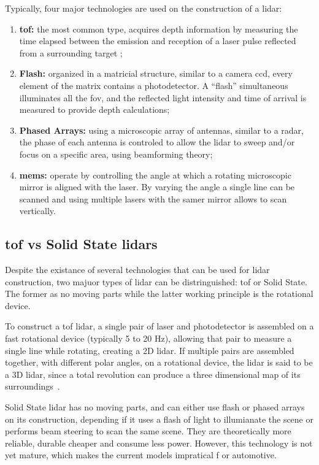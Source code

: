 Typically, four major technologies are used on the construction of a \ac{lidar}:

\begin{enumerate}
	\item \textbf{\ac{tof}:} the most common type, acquires depth information by measuring the time elapsed between the emission and reception of a \ac{laser} pulse reflected from a surrounding target \cite{Sullivan2016};
	\item \textbf{Flash:} organized in a matricial structure, similar to a camera \ac{ccd}, every element of the matrix contains a photodetector. A ``flash'' simultaneous illuminates all the \ac{fov}, and the reflected light intensity and time of arrival is measured to provide depth calculations; 
	\item \textbf{Phased Arrays:} using a microscopic array of antennas, similar to a \ac{radar}, the phase of each antenna is controled to allow the \ac{lidar} to sweep and/or focus on a specific area, using beamforming theory;
	\item \textbf{\ac{mems}:} operate by controlling the angle at which a rotating microscopic mirror is aligned with the \ac{laser}. By varying the angle a single line can be scanned and using multiple \acp{laser} with the samer mirror allows to scan vertically.

\end{enumerate}


\subsection{\acl{tof} vs Solid State \acp{lidar}}
Despite the existance of several technologies that can be used for \ac{lidar} construction, two majuor types of \ac{lidar} can be distringuished: \ac{tof} or Solid State. The former as no moving parts while the latter working principle is the rotational device.

To construct a \ac{tof} \ac{lidar}, a single pair of \ac{laser} and photodetector is assembled on a fast rotational device (typically 5 to 20 Hz), allowing that pair to measure a single line while rotating, creating a 2D \ac{lidar}. If multiple pairs are assembled together, with different polar angles, on a rotational device, the \ac{lidar} is said to be a 3D \ac{lidar}, since a total revolution can produce a three dimensional map of its surroundings~\cite{Sullivan2016}.

Solid State \ac{lidar} has no moving parts, and can either use flash or phased arrays on its construction, depending if it uses a flash of light to illumianate the scene or performs beam steering to scan the same scene. They are theoretically more reliable, durable cheaper and consume less power. However, this technology is not yet mature, which makes the current models impratical f or automotive. 

